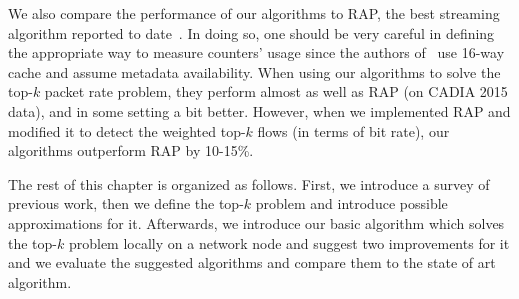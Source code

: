 We also compare the performance of our algorithms to RAP, the best streaming algorithm reported to date~\cite{Ben-Basat2017}. In doing so, one should be very careful in defining the appropriate way to measure counters' usage since the authors of~\cite{Ben-Basat2017} use 16-way cache and assume metadata availability. When using our algorithms to solve the top-$k$ packet rate problem, they perform almost as well as RAP (on CADIA 2015 data), and in some setting a bit better. However, when we implemented RAP and modified it to detect the weighted top-$k$ flows (in terms of bit rate), our algorithms outperform RAP by 10-15\%.



The rest of this chapter is organized as follows. First, we introduce a survey of previous work, then we define the top-$k$ problem and introduce possible approximations for it. Afterwards, we introduce our basic algorithm which solves the top-$k$ problem locally on a network node and suggest two improvements for it and we evaluate the suggested algorithms and compare them to the state of art algorithm.